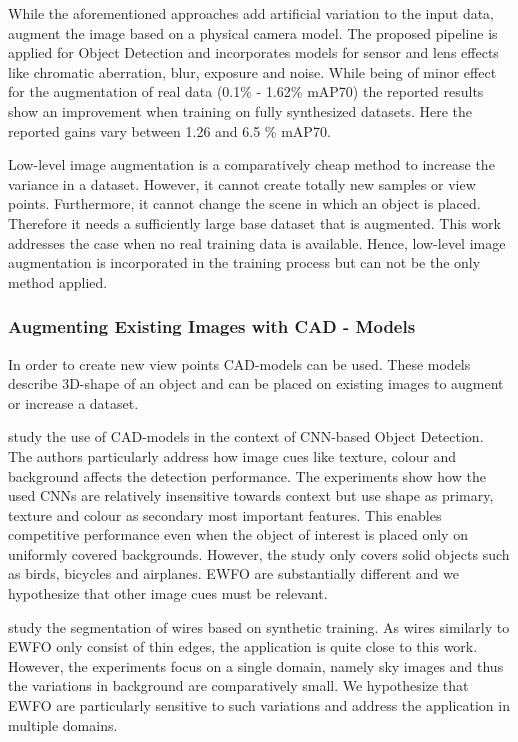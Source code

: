 While the aforementioned approaches add artificial variation to the input data, \citeauthor{Carlson2018}\cite{Carlson2018} augment the image based on a physical camera model. The proposed pipeline is applied for Object Detection and incorporates models for sensor and lens effects like chromatic aberration, blur, exposure and noise. While being of minor effect for the augmentation of real data (0.1\% - 1.62\% \ac{mAP}70) the reported results show an improvement when training on fully synthesized datasets. Here the reported gains vary between 1.26 and 6.5 \% \ac{mAP}70.

Low-level image augmentation is a comparatively cheap method to increase the variance in a dataset. However, it cannot create totally new samples or view points. Furthermore, it cannot change the scene in which an object is placed. Therefore it needs a sufficiently large base dataset that is augmented. This work addresses the case when no real training data is available. Hence, low-level image augmentation is incorporated in the training process but can not be the only method applied.

\subsubsection{Augmenting Existing Images with CAD - Models}

In order to create new view points \ac{CAD}-models can be used. These models describe 3D-shape of an object and can be placed on existing images to augment or increase a dataset.

\citeauthor{Peng}\cite{Peng} study the use of \ac{CAD}-models in the context of \ac{CNN}-based Object Detection. The authors particularly address how image cues like texture, colour and background affects the detection performance. The experiments show how the used \acp{CNN} are relatively insensitive towards context but use shape as primary, texture and colour as secondary most important features. This enables competitive performance even when the object of interest is placed only on uniformly covered backgrounds. However, the study only covers solid objects such as birds, bicycles and airplanes. \ac{EWFO} are substantially different and we hypothesize that other image cues must be relevant.

\citeauthor{Madaan2017}\cite{Madaan2017} study the segmentation of wires based on synthetic training. As wires similarly to \ac{EWFO} only consist of thin edges, the application is quite close to this work. However, the experiments focus on a single domain, namely sky images and thus the variations in background are comparatively small. We hypothesize that \ac{EWFO} are particularly sensitive to such variations and address the application in multiple domains.

